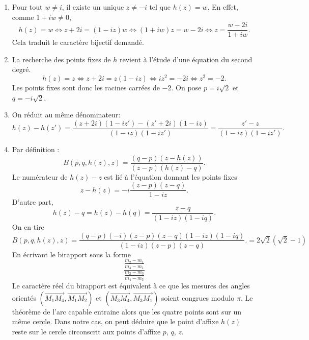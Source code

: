 \begin{enumerate}
 \item Pour tout $w\neq i$, il existe un unique $z\neq -i$ tel que $h(z)=w$. En effet, comme $1+iw\neq 0$,
\begin{displaymath}
 h(z)=w\Leftrightarrow z+2i = (1-iz)w \Leftrightarrow (1+iw)z=w-2i \Leftrightarrow z = \frac{w-2i}{1+iw}.
\end{displaymath}
Cela traduit le caractère bijectif demandé.
 \item La recherche des points fixes de $h$ revient à l'étude d'une équation du second degré.
\begin{displaymath}
 h(z)=z \Leftrightarrow z+2i = z(1-iz) \Leftrightarrow iz^2 = -2i \Leftrightarrow z^2 = -2.
\end{displaymath}
Les points fixes sont donc les racines carrées de $-2$. On pose $p=i\sqrt{2}$ et $q=-i\sqrt{2}$.
 \item On réduit au même dénominateur:
\begin{displaymath}
 h(z)-h(z')=\frac{(z+2i)(1-iz')-(z'+2i)(1-iz)}{(1-iz)(1-iz')}
=\frac{z' -z}{(1-iz)(1-iz')}.
\end{displaymath}

 \item Par définition :
\begin{displaymath}
 B(p,q,h(z),z)= \frac{(q-p)(z-h(z))}{(z-p)(h(z)-q)}.
\end{displaymath}
Le numérateur de $h(z)-z$ est lié à l'équation donnant les points fixes
\begin{displaymath}
 z -h(z) = -i\frac{(z-p)(z-q)}{1-iz} .
\end{displaymath}
D'autre part,
\begin{displaymath}
 h(z)-q = h(z)-h(q)= \frac{z -q}{(1-iz)(1-iq)}.
\end{displaymath}
On en tire
\begin{displaymath}
 B(p,q,h(z),z)=\frac{(q-p)(-i)(z-p)(z-q)(1-iz)(1-iq)}{(1-iz)(z-p)(z-q)}.
=2\sqrt{2}(\sqrt{2}-1)
\end{displaymath}
En écrivant le birapport sous la forme
\begin{displaymath}
 \frac{\frac{m_2 -m_1}{m_4-m_1}}{\frac{m_2-m_3}{m_4-m_3}}
\end{displaymath}
Le caractère réel du birapport est équivalent à ce que les mesures des angles orientés $(\overrightarrow{M_1M_4},\overrightarrow{M_1M_2})$ et $(\overrightarrow{M_3M_4},\overrightarrow{M_3M_1})$ soient congrues modulo $\pi$. Le théorème de l'arc capable entraine alors que les quatre points sont sur un même cercle. Dans notre cas, on peut déduire que le point d'affixe $h(z)$ reste sur le cercle circonscrit aux points d'affixe $p$, $q$, $z$.
\end{enumerate}

